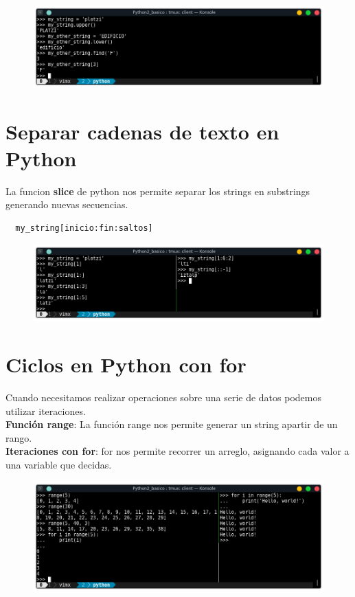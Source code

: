 \documentclass{article}
\begin{document}
\begin{figure}[h!]
  \centering
  \includegraphics[scale=0.75]{./Pictures/005_methods_string.png}
\end{figure}


\section{Separar cadenas de texto en Python}%
La funcion \textbf{slice} de python nos permite separar los strings en
substrings generando nuevas secuencias.

\begin{verbatim}
  my_string[inicio:fin:saltos]
\end{verbatim}

\begin{figure}[h!]
  \centering
  \includegraphics[scale=0.75]{./Pictures/019_slices.png}
\end{figure}


\newpage

\section{Ciclos en Python con for}%
Cuando necesitamos realizar operaciones sobre una serie de datos podemos
utilizar iteraciones.\\

\textbf{Función range}: La función range nos permite generar un string apartir
de un rango.\\

\textbf{Iteraciones con for}: for nos permite recorrer un arreglo,
asignando cada valor a una variable que decidas.

\begin{figure}[h!]
  \centering
  \includegraphics[scale=0.75]{./Pictures/020_range_for.png}
\end{figure}
\end{document}

